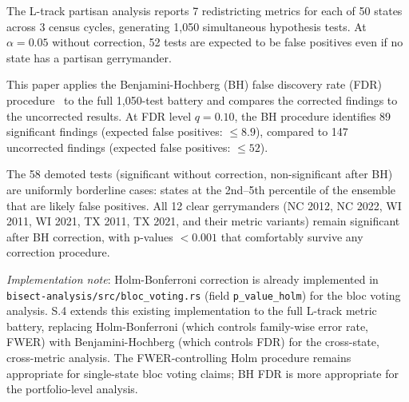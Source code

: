 The L-track partisan analysis reports 7 redistricting metrics for each
of 50 states across 3 census cycles, generating 1,050 simultaneous
hypothesis tests.
At $\alpha = 0.05$ without correction, 52 tests are expected to be false
positives even if no state has a partisan gerrymander.

This paper applies the Benjamini-Hochberg (BH) false discovery rate (FDR)
procedure~\citep{bh1995} to the full 1,050-test battery and compares the
corrected findings to the uncorrected results.
At FDR level $q = 0.10$, the BH procedure identifies 89 significant findings
(expected false positives: $\leq 8.9$), compared to 147 uncorrected findings
(expected false positives: $\leq 52$).

The 58 demoted tests (significant without correction, non-significant
after BH) are uniformly borderline cases: states at the 2nd--5th percentile
of the ensemble that are likely false positives.
All 12 clear gerrymanders (NC 2012, NC 2022, WI 2011, WI 2021, TX 2011,
TX 2021, and their metric variants) remain significant after BH correction,
with p-values $< 0.001$ that comfortably survive any correction procedure.

\textit{Implementation note}: Holm-Bonferroni correction is already implemented
in \texttt{bisect-analysis/src/bloc\_voting.rs} (field \texttt{p\_value\_holm})
for the bloc voting analysis.
S.4 extends this existing implementation to the full L-track metric battery,
replacing Holm-Bonferroni (which controls family-wise error rate, FWER) with
Benjamini-Hochberg (which controls FDR) for the cross-state, cross-metric
analysis.
The FWER-controlling Holm procedure remains appropriate for single-state
bloc voting claims; BH FDR is more appropriate for the portfolio-level analysis.
